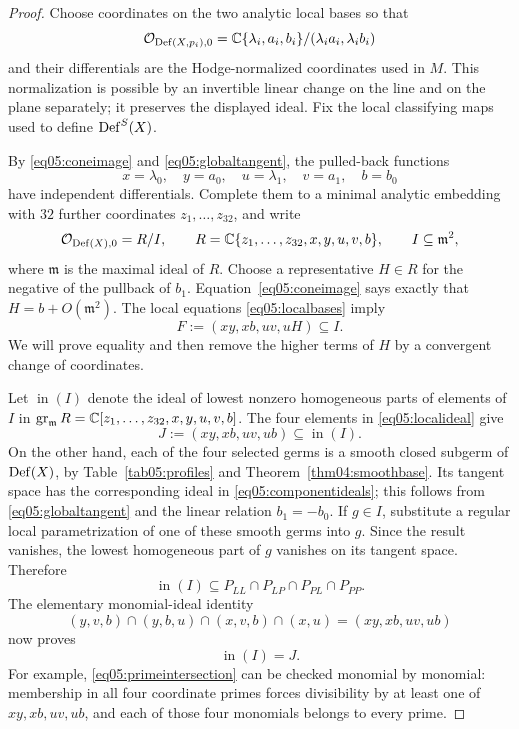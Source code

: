 \begin{proof}
Choose coordinates on the two analytic local bases so that
\begin{equation}\label{eq05:localbases}
 \mathcal{O}_{\operatorname{Def}(X,p_i),0}=
 \mathbb{C}\{\lambda_i,a_i,b_i\}/(\lambda_i a_i,\lambda_i b_i)
\end{equation}
and their differentials are the Hodge-normalized coordinates used in
$M$.  This normalization is possible by an invertible linear change
on the line and on the plane separately; it preserves the displayed
ideal.  Fix the local classifying maps used to define $\operatorname{Def}^S(X)$.

By \eqref{eq05:coneimage} and \eqref{eq05:globaltangent}, the pulled-back
functions
\[
 x=\lambda_0,\quad y=a_0,\quad u=\lambda_1,\quad v=a_1,\quad b=b_0
\]
have independent differentials.  Complete them to a minimal analytic
embedding with $32$ further coordinates $z_1,\ldots,z_{32}$, and write
\[
 \mathcal{O}_{\operatorname{Def}(X),0}=R/I,\qquad
 R=\mathbb{C}\{z_1,\ldots,z_{32},x,y,u,v,b\},\qquad
 I\subseteq\mathfrak m^2,
\]
where $\mathfrak m$ is the maximal ideal of $R$.
Choose a representative $H\in R$ for the negative of the pullback of
$b_1$.  Equation~\eqref{eq05:coneimage} says exactly that
$H=b+O(\mathfrak m^2)$.  The local equations
\eqref{eq05:localbases} imply
\begin{equation}\label{eq05:localideal}
 F:=(xy,xb,uv,uH)\subseteq I.
\end{equation}
We will prove equality and then remove the higher terms of $H$ by a
convergent change of coordinates.

Let $\operatorname{in}(I)$ denote the ideal of lowest nonzero homogeneous
parts of elements of $I$ in
$\operatorname{gr}_{\mathfrak m}R=\mathbb{C}[z_1,\ldots,z_{32},x,y,u,v,b]$.
The four elements in \eqref{eq05:localideal} give
\[
 J:=(xy,xb,uv,ub)\subseteq\operatorname{in}(I).
\]
On the other hand, each of the four selected germs is a smooth closed
subgerm of $\operatorname{Def}(X)$, by Table~\ref{tab05:profiles} and
Theorem~\ref{thm04:smoothbase}.  Its tangent space has the corresponding
ideal in \eqref{eq05:componentideals}; this follows from
\eqref{eq05:globaltangent} and the linear relation $b_1=-b_0$.
If $g\in I$, substitute a regular local parametrization of one of these
smooth germs into $g$.  Since the result vanishes, the lowest homogeneous
part of $g$ vanishes on its tangent space.  Therefore
\[
 \operatorname{in}(I)\subseteq
 P_{LL}\cap P_{LP}\cap P_{PL}\cap P_{PP}.
\]
The elementary monomial-ideal identity
\begin{equation}\label{eq05:primeintersection}
 (y,v,b)\cap(y,b,u)\cap(x,v,b)\cap(x,u)
 =(xy,xb,uv,ub)
\end{equation}
now proves
\begin{equation}\label{eq05:initialideal}
 \operatorname{in}(I)=J.
\end{equation}
For example, \eqref{eq05:primeintersection} can be checked monomial by
monomial: membership in all four coordinate primes forces divisibility
by at least one of $xy,xb,uv,ub$, and each of those four monomials
belongs to every prime.


\end{proof}
